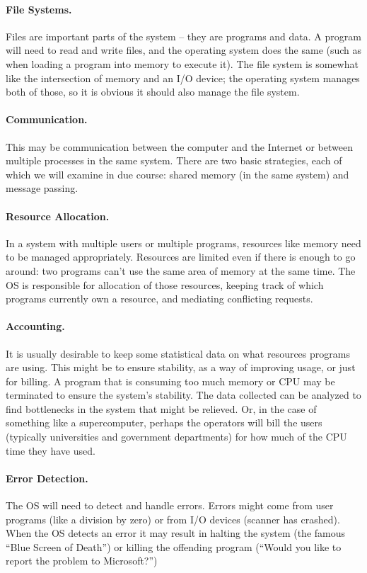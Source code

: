 \paragraph{File Systems.} Files are important parts of the system -- they are programs and data. A program will need to read and write files, and the operating system does the same (such as when loading a program into memory to execute it). The file system is somewhat like the intersection of memory and an I/O device; the operating system manages both of those, so it is obvious it should also manage the file system.

\paragraph{Communication.} This may be communication between the computer and the Internet or between multiple processes in the same system. There are two basic strategies, each of which we will examine in due course: shared memory (in the same system) and message passing.

\paragraph{Resource Allocation.} In a system with multiple users or multiple programs, resources like memory need to be managed appropriately. Resources are limited even if there is enough to go around: two programs can't use the same area of memory at the same time. The OS is responsible for allocation of those resources, keeping track of which programs currently own a resource, and mediating conflicting requests.

\paragraph{Accounting.} It is usually desirable to keep some statistical data on what resources programs are using. This might be to ensure stability, as a way of improving usage, or just for billing. A program that is consuming too much memory or CPU may be terminated to ensure the system's stability. The data collected can be analyzed to find bottlenecks in the system that might be relieved. Or, in the case of something like a supercomputer, perhaps the operators will bill the users (typically universities and government departments) for how much of the CPU time they have used.

\paragraph{Error Detection.} The OS will need to detect and handle errors. Errors might come from user programs (like a division by zero) or from I/O devices (scanner has crashed). When the OS detects an error it may result in halting the system (the famous ``Blue Screen of Death'') or killing the offending program (``Would you like to report the problem to Microsoft?'')

